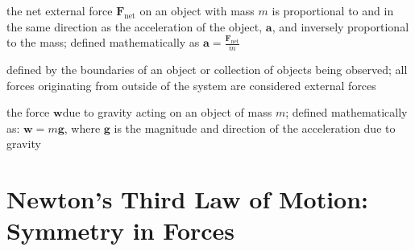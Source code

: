 \documentclass[
]{book}
\providecommand{\tightlist}{%
  \setlength{\itemsep}{0pt}\setlength{\parskip}{0pt}}
\begin{document}
\begin{description}
\tightlist
\item[Newton's second law of motion]
the net external force \(\textbf{F}_{\text{net}}{}\) on an object with
mass \(m{}\) is proportional to and in the same direction as the
acceleration of the object, \(\textbf{a}{}\), and inversely
proportional to the mass; defined mathematically as
\(\textbf{a} = \frac{\textbf{F}_{\text{net}}}{m}\)
\end{description}

\begin{description}
\tightlist
\item[system]
defined by the boundaries of an object or collection of objects
being observed; all forces originating from outside of the system
are considered external forces
\end{description}

\begin{description}
\tightlist
\item[weight]
the force \(\textbf{w}{}\)due to gravity acting on an object of mass
\(m{}\); defined mathematically as: \emph{\({\textbf{w} = m\textbf{g}}{}\)},
where \(\textbf{g}{}\) is the magnitude and direction of the
acceleration due to gravity
\end{description}

\hypertarget{newtons-third-law-of-motion-symmetry-in-forces}{%
\section{Newton's Third Law of Motion: Symmetry in Forces}\label{newtons-third-law-of-motion-symmetry-in-forces}}
\end{document}
